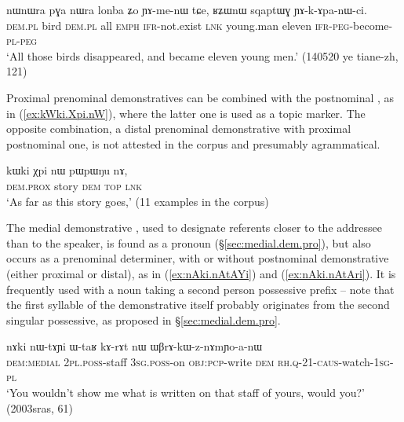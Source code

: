 \begin{exe}
\ex \label{ex:nWnWra.pGa.nWra}
 \gll nɯnɯra pɣa nɯra lonba ʑo ɲɤ-me-nɯ tɕe, ʁʑɯnɯ sqaptɯɣ ɲɤ-k-ɤpa-nɯ-ci. \\
 \textsc{dem}.\textsc{pl} bird  \textsc{dem}.\textsc{pl}  all \textsc{emph} \textsc{ifr}-not.exist \textsc{lnk} young.man eleven \textsc{ifr}-\textsc{peg}-become-\textsc{pl}-\textsc{peg} \\
 \glt `All those birds disappeared, and became eleven young men.' (140520 ye tiane-zh, 121)
\end{exe}

Proximal prenominal demonstratives can be combined with the postnominal , as in (\ref{ex:kWki.Xpi.nW}), where the latter one is used as a topic marker. The opposite combination, a distal prenominal demonstrative with proximal postnominal one, is not attested in the corpus and presumably agrammatical.

\begin{exe}
\ex \label{ex:kWki.Xpi.nW}
 \gll kɯki χpi nɯ pɯpɯŋu nɤ,  \\
 \textsc{dem}.\textsc{prox} story \textsc{dem} \textsc{top} \textsc{lnk} \\
 \glt `As far as this story goes,' (11 examples in the corpus)
\end{exe}

The medial demonstrative , used to designate referents closer to the addressee than to the speaker, is found as a pronoun (§\ref{sec:medial.dem.pro}), but also occurs as a prenominal determiner, with or without postnominal demonstrative (either proximal or distal), as in (\ref{ex:nAki.nAtAYi}) and (\ref{ex:nAki.nAtAri}). It is frequently used with a noun taking a second person possessive prefix -- note that the first syllable  of the demonstrative  itself probably originates from the second singular possessive, as proposed in §\ref{sec:medial.dem.pro}.

\begin{exe}
\ex \label{ex:nAki.nAtAYi}
 \gll nɤki nɯ-tɤɲi ɯ-taʁ kɤ-rɤt nɯ ɯβrɤ-kɯ-z-nɤmɲo-a-nɯ \\
 \textsc{dem}:\textsc{medial} \textsc{2pl}.\textsc{poss}-staff \textsc{3sg}.\textsc{poss}-on \textsc{obj}:\textsc{pcp}-write \textsc{dem} \textsc{rh}.\textsc{q}-2\fl{}1-\textsc{caus}-watch-\textsc{1sg}-\textsc{pl} \\
 \glt `You wouldn't show me what is written on that staff of yours, would you?' (2003sras, 61)
\end{exe}


